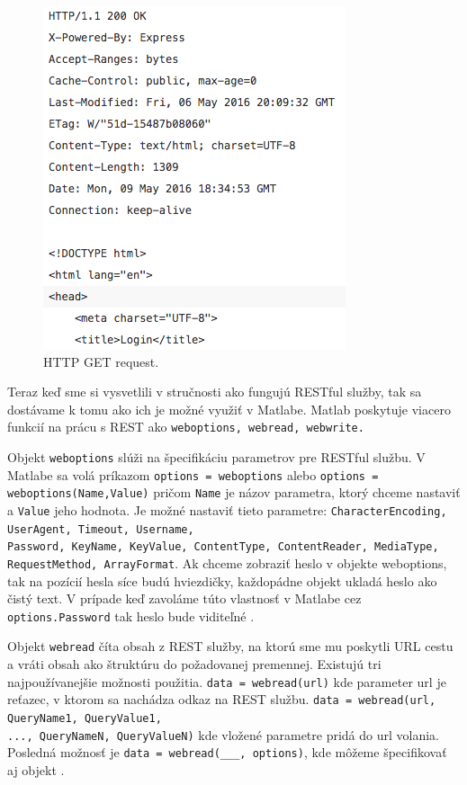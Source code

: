 \begin{figure}[H]
  \centering
  \includegraphics[scale=0.7]{img/rest/get-request.png}
  \caption{HTTP GET request.}
  \label{get-http}
\end{figure}

Teraz keď sme si vysvetlili v stručnosti ako fungujú RESTful služby, tak sa dostávame k tomu ako ich je možné využiť v Matlabe. Matlab poskytuje viacero funkcií na prácu s REST ako \verb|weboptions, webread, webwrite.|

Objekt \verb|weboptions| slúži na špecifikáciu parametrov pre RESTful službu. V Matlabe sa volá príkazom \verb|options = weboptions| alebo \verb|options = weboptions(Name,Value)| pričom \verb|Name| je názov parametra, ktorý chceme nastaviť a \verb|Value| jeho hodnota. Je možné nastaviť tieto parametre: \verb|CharacterEncoding, UserAgent, Timeout, Username,| \\ \verb|Password, KeyName, KeyValue, ContentType, ContentReader, MediaType,| \\ \verb|RequestMethod, ArrayFormat|. Ak chceme zobraziť heslo v objekte weboptions, tak na pozícií hesla síce budú hviezdičky, každopádne objekt ukladá heslo ako čistý text. V prípade keď zavoláme túto vlastnosť v Matlabe cez \verb|options.Password| tak heslo bude viditeľné \cite{matlab-weboptions}.

Objekt \verb|webread| číta obsah z REST služby, na ktorú sme mu poskytli URL cestu a vráti obsah ako štruktúru do požadovanej premennej. Existujú tri najpoužívanejšie možnosti použitia. \verb|data = webread(url)| kde parameter url je reťazec, v ktorom sa nachádza odkaz na REST službu. \verb|data = webread(url, QueryName1, QueryValue1,| \\ \verb|..., QueryNameN, QueryValueN)| kde vložené parametre pridá do url volania. Posledná možnosť je \verb|data = webread(___, options)|, kde môžeme špecifikovať aj  objekt \cite{matlab-webread}.

